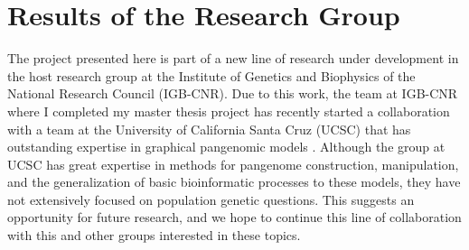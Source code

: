 \chapter{Results of the Research Group}%


The project presented here is part of a new line of research under development in the host research group at the Institute of Genetics and Biophysics of the National Research Council (IGB-CNR).
Due to this work, the team at IGB-CNR where I completed my master thesis project has recently started a collaboration \cite{eizenga2020succinct} with a team at the University of California Santa Cruz (UCSC) that has outstanding expertise in graphical pangenomic models \cite{garrison2019graphical,hickey2020genotyping,eizenga2020pangenome,siren2020haplotype,rhie2020towards,eizenga2020succinct,martiniano2020removing,llamas2019strategy,carletti2019graph,siren2019supplement,chin2019diploid,garrison2018variation,garg2018graph,paten2018superbubbles,computational2018computational}.
Although the group at UCSC has great expertise in methods for pangenome construction, manipulation, and the generalization of basic bioinformatic processes to these models, they have not extensively focused on population genetic questions.
This suggests an opportunity for future research, and we hope to continue this line of collaboration with this and other groups interested in these topics.

